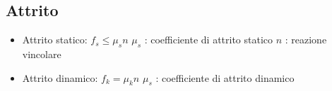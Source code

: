 \documentclass[a4paper,14pt,landscape]{extarticle}
\begin{document}
\begin{multicols*}{2}
    \section*{Attrito}
    \begin{itemize}
        \item Attrito statico: $f_s \leq \mu_s n$ \newline
              $\mu_s$ : coefficiente di attrito statico \newline
              $n$ : reazione vincolare
        \item Attrito dinamico: $f_k = \mu_k n$ \newline
              $\mu_s$ : coefficiente di attrito dinamico
    \end{itemize}


\end{multicols*}
\end{document}

